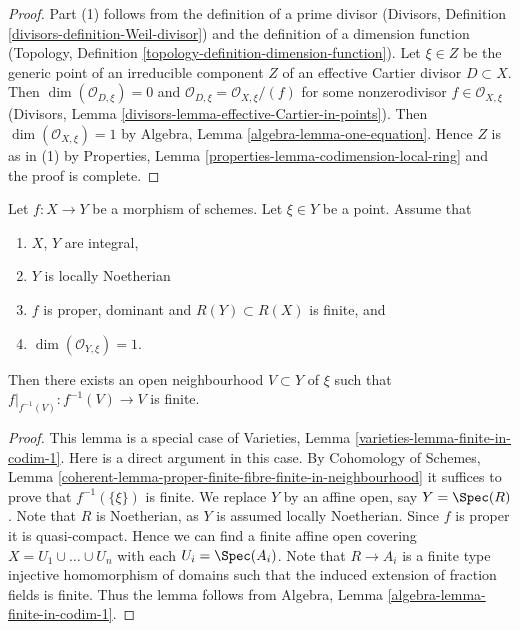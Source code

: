 \begin{proof}
Part (1) follows from the definition of a prime divisor
(Divisors, Definition \ref{divisors-definition-Weil-divisor})
and the definition of a dimension function
(Topology, Definition \ref{topology-definition-dimension-function}).
Let $\xi \in Z$ be the generic point of an irreducible component $Z$ of
an effective Cartier divisor $D \subset X$.
Then $\dim(\mathcal{O}_{D, \xi}) = 0$ and
$\mathcal{O}_{D, \xi} = \mathcal{O}_{X, \xi}/(f)$ for some
nonzerodivisor $f \in \mathcal{O}_{X, \xi}$ (Divisors,
Lemma \ref{divisors-lemma-effective-Cartier-in-points}).
Then $\dim(\mathcal{O}_{X, \xi}) = 1$ by
Algebra, Lemma \ref{algebra-lemma-one-equation}. Hence $Z$ is as in (1) by
Properties, Lemma \ref{properties-lemma-codimension-local-ring}
and the proof is complete.
\end{proof}

\begin{lemma}
\label{lemma-finite-in-codimension-one}
Let $f : X \to Y$ be a morphism of schemes.
Let $\xi \in Y$ be a point.
Assume that
\begin{enumerate}
\item $X$, $Y$ are integral,
\item $Y$ is locally Noetherian
\item $f$ is proper, dominant and $R(Y) \subset R(X)$ is finite, and
\item $\dim(\mathcal{O}_{Y, \xi}) = 1$.
\end{enumerate}
Then there exists an open neighbourhood $V \subset Y$ of $\xi$
such that $f|_{f^{-1}(V)} : f^{-1}(V) \to V$ is finite.
\end{lemma}

\begin{proof}
This lemma is a special case of
Varieties, Lemma \ref{varieties-lemma-finite-in-codim-1}.
Here is a direct argument in this case.
By Cohomology of Schemes,
Lemma \ref{coherent-lemma-proper-finite-fibre-finite-in-neighbourhood}
it suffices to prove that $f^{-1}(\{\xi\})$ is finite.
We replace $Y$ by an affine open, say $Y = \Spec(R)$.
Note that $R$ is Noetherian, as $Y$ is assumed locally Noetherian.
Since $f$ is proper it is quasi-compact. Hence we can find a finite
affine open covering $X = U_1 \cup \ldots \cup U_n$ with
each $U_i = \Spec(A_i)$. Note that $R \to A_i$ is a
finite type injective homomorphism of domains such that
the induced extension of fraction fields is finite.
Thus the lemma follows
from Algebra, Lemma \ref{algebra-lemma-finite-in-codim-1}.
\end{proof}


